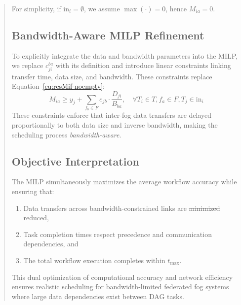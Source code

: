 \documentclass[conference]{IEEEtran}
\newcommand{\anninsert}[2]{{\color{#1}#2}}
\newcommand{\anninsert}[2]{#2}
\newcommand{\af}[1]{\anninsert{violet}{#1}}
\begin{document}
\begin{abstract}
For simplicity, if $\text{in}_i = \emptyset$, we assume $\max(\cdot) = 0$, hence $M_{ia} = 0$.

\subsection{Bandwidth-Aware MILP Refinement}

To explicitly integrate the data and bandwidth parameters into the MILP, we replace \( c_{ji}^{ba} \) with its definition and introduce linear \af{constraints linking transfer time, data size, and bandwidth. These constraints replace Equation~\ref{eq:resMif-noempty}:}
\begin{equation}
\label{eq:bandwidth}
    M_{ia} \geq y_j + \sum_{f_b \in F} e_{jb} \cdot \frac{D_{ji}}{B_{ba}}, \quad \forall T_i \in T, f_a \in F, T_j \in \text{in}_i
\end{equation}
\af{These constraints enforce} that inter-fog data transfers are delayed proportionally to both data size and inverse bandwidth, making the scheduling process \textit{bandwidth-aware}.

\subsection{Objective Interpretation}

The MILP simultaneously maximizes the average workflow accuracy while ensuring that:
\begin{enumerate}
    \item Data transfers across bandwidth-constrained links are \af{\sout{minimized} reduced},
    \item Task completion times respect precedence and communication dependencies, and
    \item The total workflow execution completes within \(t_{\max}\).
\end{enumerate}

This dual optimization of computational accuracy and network efficiency ensures realistic scheduling for bandwidth-limited federated fog systems where large data dependencies exist between DAG tasks.



    

\end{abstract}
\end{document}

